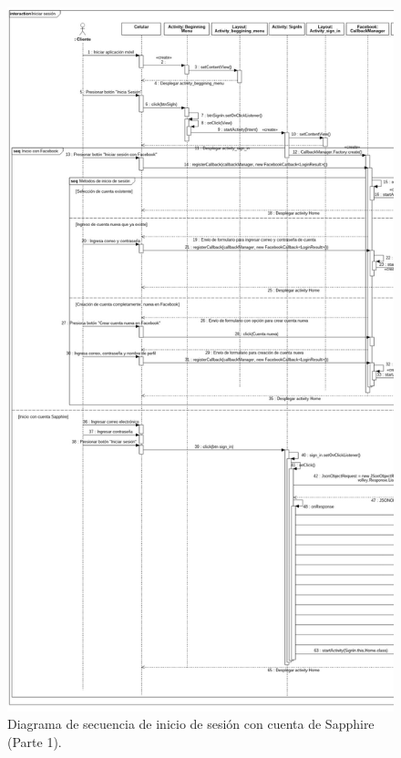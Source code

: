 \FloatBarrier
\begin{figure}[htbp!]
		\centering
			\includegraphics[width=.7 \textwidth]{imagenes/Diagramas_UserApp/Nuevos_diagramas/inicioSap1}
		\caption{Diagrama de secuencia de inicio de sesión con cuenta de Sapphire (Parte 1).}
		\label{image:inicioSap1}
\end{figure}
\FloatBarrier

